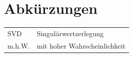 \documentclass[12pt,a4paper,twoside]{article}
\begin{document}
\section*{Abkürzungen}
	\begin{tabular}{ll}
		SVD & Singulärwertzerlegung \\
		m.h.W. & mit hoher Wahrscheinlichkeit \\
	\end{tabular}
\newpage

\end{document}
